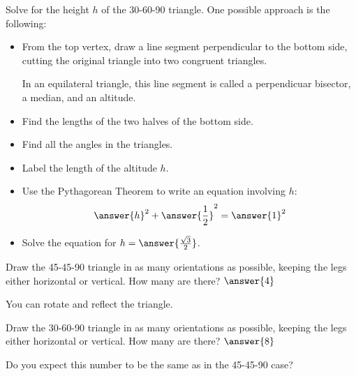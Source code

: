 \documentclass[number]{ximera}
\begin{document}
\begin{problem}
Solve for the height $h$ of the 30-60-90 triangle. One possible approach is the following:

\begin{itemize}
\item From the top vertex, draw a line segment perpendicular to the bottom side, cutting the original triangle into two congruent triangles. 
\begin{hint}
In an equilateral triangle, this line segment is called a perpendicuar bisector, a median, and an altitude.
\end{hint}
\item Find the lengths of the two halves of the bottom side.
\item Find all the angles in the triangles.
\item Label the length of the altitude $h$.
\item Use the Pythagorean Theorem to write an equation involving $h$:
\[\answer{h}^2 + \answer{\frac{1}{2}}^2 = \answer{1}^2\]
\item Solve the equation for $h = \answer{\frac{\sqrt{3}}{2}}$.
\end{itemize}
\end{problem}

\begin{problem} Draw the 45-45-90 triangle in as many orientations as possible, keeping the legs either horizontal or vertical. How many are there? $\answer{4}$
\begin{hint}
You can rotate and reflect the triangle.
\end{hint}
\end{problem}

\begin{problem} Draw the 30-60-90 triangle in as many orientations as possible, keeping the legs either horizontal or vertical. How many are there? $\answer{8}$
\begin{hint}
Do you expect this number to be the same as in the 45-45-90 case?
\end{hint}

\end{problem}
\end{document}
